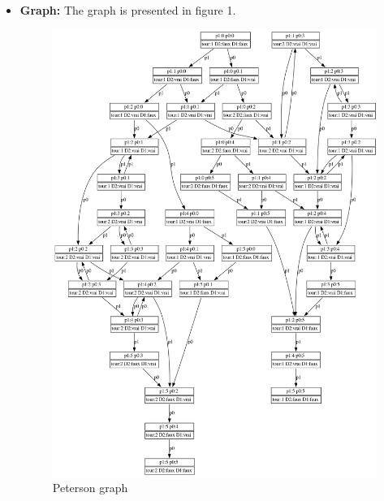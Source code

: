 \documentclass{article}
\begin{document}
\begin{itemize}
  \item \textbf{Graph:} The graph is presented in figure 1.
  \begin{figure}
    \includegraphics[width=\linewidth]{graphPeterson.png}
      \caption{Peterson graph}
      \label{fig:peterson}
  \end{figure}
\end{itemize}
\newpage
\end{document}
